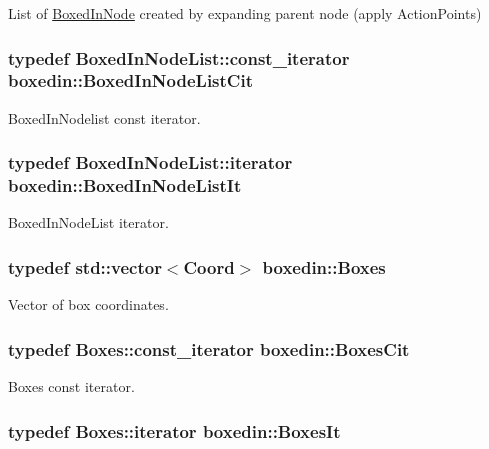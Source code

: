 List of \hyperlink{classboxedin_1_1BoxedInNode}{Boxed\+In\+Node} created by expanding parent node (apply Action\+Points) \hypertarget{namespaceboxedin_a840999e14b7b86c1333d2980f406682b}{
\subsubsection[{Boxed\+In\+Node\+List\+Cit}]{\setlength{\rightskip}{0pt plus 5cm}typedef Boxed\+In\+Node\+List\+::const\+\_\+iterator {\bf boxedin\+::\+Boxed\+In\+Node\+List\+Cit}}}\label{namespaceboxedin_a840999e14b7b86c1333d2980f406682b}
Boxed\+In\+Nodelist const iterator. \hypertarget{namespaceboxedin_a67fd73b97479017eac16cbd43f979636}{
\subsubsection[{Boxed\+In\+Node\+List\+It}]{\setlength{\rightskip}{0pt plus 5cm}typedef Boxed\+In\+Node\+List\+::iterator {\bf boxedin\+::\+Boxed\+In\+Node\+List\+It}}}\label{namespaceboxedin_a67fd73b97479017eac16cbd43f979636}
Boxed\+In\+Node\+List iterator. \hypertarget{namespaceboxedin_a9cf4c1fe66d111542a6b853f276b5d63}{
\subsubsection[{Boxes}]{\setlength{\rightskip}{0pt plus 5cm}typedef std\+::vector$<${\bf Coord}$>$ {\bf boxedin\+::\+Boxes}}}\label{namespaceboxedin_a9cf4c1fe66d111542a6b853f276b5d63}
Vector of box coordinates. \hypertarget{namespaceboxedin_ae12efbf42d3d7cae8554a7cfe89373ef}{
\subsubsection[{Boxes\+Cit}]{\setlength{\rightskip}{0pt plus 5cm}typedef Boxes\+::const\+\_\+iterator {\bf boxedin\+::\+Boxes\+Cit}}}\label{namespaceboxedin_ae12efbf42d3d7cae8554a7cfe89373ef}
Boxes const iterator. \hypertarget{namespaceboxedin_ad09b9ae0e0fe0b8fe4ded755de971056}{
\subsubsection[{Boxes\+It}]{\setlength{\rightskip}{0pt plus 5cm}typedef Boxes\+::iterator {\bf boxedin\+::\+Boxes\+It}}}\label{namespaceboxedin_ad09b9ae0e0fe0b8fe4ded755de971056}
